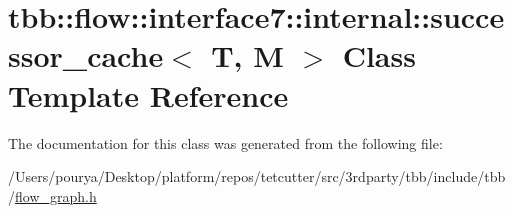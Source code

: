 \hypertarget{classtbb_1_1flow_1_1interface7_1_1internal_1_1successor__cache}{}\section{tbb\+:\+:flow\+:\+:interface7\+:\+:internal\+:\+:successor\+\_\+cache$<$ T, M $>$ Class Template Reference}
\label{classtbb_1_1flow_1_1interface7_1_1internal_1_1successor__cache}


The documentation for this class was generated from the following file\+:\begin{DoxyCompactItemize}
\item 
/\+Users/pourya/\+Desktop/platform/repos/tetcutter/src/3rdparty/tbb/include/tbb/\hyperlink{flow__graph_8h}{flow\+\_\+graph.\+h}\end{DoxyCompactItemize}
